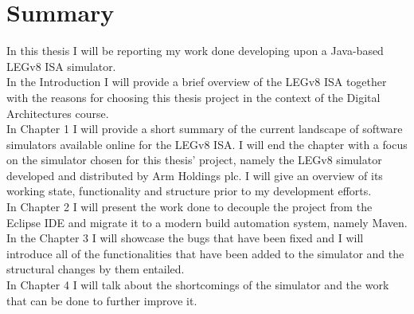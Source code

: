 \chapter{Summary}

In this thesis I will be reporting my work done developing upon a Java-based LEGv8 ISA simulator.
\\

In the Introduction I will provide a brief overview of the LEGv8 ISA together with the reasons for choosing this thesis project in the context of the Digital Architectures course.
\\

In Chapter 1 I will provide a short summary of the current landscape of software simulators available online for the LEGv8 ISA. I will end the chapter with a focus on the simulator chosen for this thesis' project, namely the LEGv8 simulator developed and distributed by Arm Holdings plc. I will give an overview of its working state, functionality and structure prior to my development efforts.
\\

In Chapter 2 I will present the work done to decouple the project from the Eclipse IDE and migrate it to a modern build automation system, namely Maven.
\\

In the Chapter 3 I will showcase the bugs that have been fixed and I will introduce all of the functionalities that have been added to the simulator and the structural changes by them entailed.
\\

In Chapter 4 I will talk about the shortcomings of the simulator and the work that can be done to further improve it.
